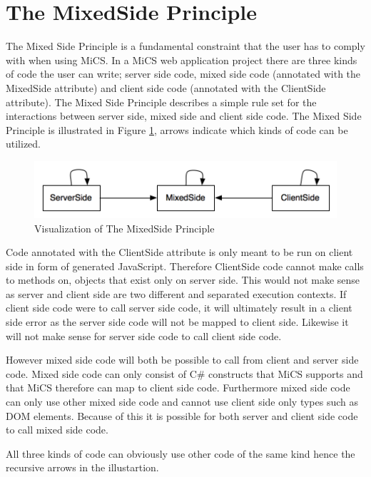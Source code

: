 	\section{The MixedSide Principle} %
	\label{sub:the_mixedside_principle}
		The Mixed Side Principle is a fundamental constraint that the user has to comply with when using MiCS. In a MiCS web application project there are three kinds of code the user can write; server side code, mixed side code (annotated with the MixedSide attribute) and client side code (annotated with the ClientSide attribute). The Mixed Side Principle describes a simple rule set for the interactions between server side, mixed side and client side code. The Mixed Side Principle is illustrated in Figure \ref{fig:MixedSidePrinciple}, arrows indicate which kinds of code can be utilized.

		\begin{figure}[H]
			\begin{center}
				\centerline{\includegraphics[width=12cm]{resources/images/MixedSidePrinciple.png}}
			\end{center}
			\caption{Visualization of The MixedSide Principle}
			\label{fig:MixedSidePrinciple}
		\end{figure}

		Code annotated with the ClientSide attribute is only meant to be run on client side in form of generated JavaScript. Therefore ClientSide code cannot make calls to methods on, objects that exist only on server side. This would not make sense as server and client side are two different and separated execution contexts.  If client side code were to call server side code, it will ultimately result in a client side error as the server side code will not be mapped to client side. Likewise it will not make sense for server side code to call client side code.

		However mixed side code will both be possible to call from client and server side code. Mixed side code can only consist of C\# constructs that MiCS supports and that MiCS therefore can map to client side code. Furthermore mixed side code can only use other mixed side code and cannot use client side only types such as DOM elements. Because of this it is possible for both server and client side code to call mixed side code.

		All three kinds of code can obviously use other code of the same kind hence the recursive arrows in the illustartion.